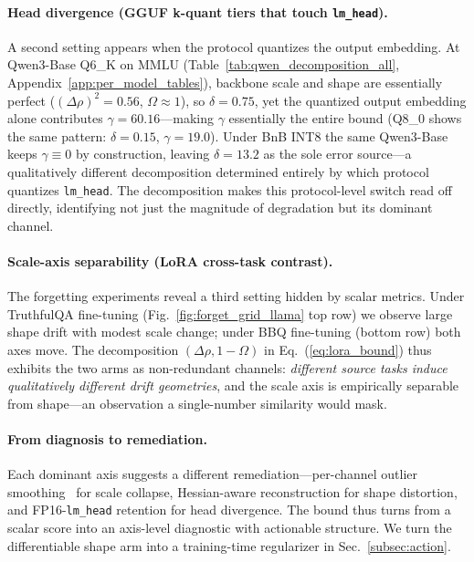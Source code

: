 \documentclass{article}
\begin{document}
\paragraph{Head divergence (GGUF k-quant tiers that touch \texttt{lm\_head}).}
A second setting appears when the protocol quantizes the output embedding. At Qwen3-Base Q6\_K on MMLU (Table~\ref{tab:qwen_decomposition_all}, Appendix~\ref{app:per_model_tables}), backbone scale and shape are essentially perfect ($(\Delta\rho)^2{=}0.56$, $\Omega \approx 1$), so $\delta{=}0.75$, yet the quantized output embedding alone contributes $\gamma{=}60.16$---making $\gamma$ essentially the entire bound (Q8\_0 shows the same pattern: $\delta{=}0.15$, $\gamma{=}19.0$). Under BnB INT8 the same Qwen3-Base keeps $\gamma{\equiv}0$ by construction, leaving $\delta{=}13.2$ as the sole error source---a qualitatively different decomposition determined entirely by which protocol quantizes \texttt{lm\_head}. The decomposition makes this protocol-level switch read off directly, identifying not just the magnitude of degradation but its dominant channel.

\paragraph{Scale-axis separability (LoRA cross-task contrast).}
The forgetting experiments reveal a third setting hidden by scalar metrics. Under TruthfulQA fine-tuning (Fig.~\ref{fig:forget_grid_llama} top row) we observe large shape drift with modest scale change; under BBQ fine-tuning (bottom row) both axes move. The decomposition $(\Delta\rho, 1{-}\Omega)$ in Eq.~(\ref{eq:lora_bound}) thus exhibits the two arms as non-redundant channels: \emph{different source tasks induce qualitatively different drift geometries}, and the scale axis is empirically separable from shape---an observation a single-number similarity would mask.

\paragraph{From diagnosis to remediation.}
Each dominant axis suggests a different remediation---per-channel outlier smoothing~\cite{xiao2023smoothquant} for scale collapse, Hessian-aware reconstruction for shape distortion, and FP16-\texttt{lm\_head} retention for head divergence. The bound thus turns from a scalar score into an axis-level diagnostic with actionable structure. We turn the differentiable shape arm into a training-time regularizer in Sec.~\ref{subsec:action}.
\end{document}
